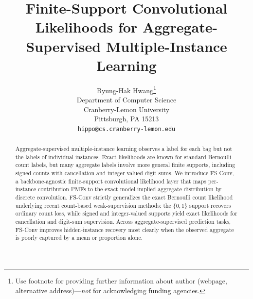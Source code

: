 \documentclass{article}
\title{Finite-Support Convolutional Likelihoods for Aggregate-Supervised Multiple-Instance Learning}
\author{%
  Byung-Hak Hwang\thanks{Use footnote for providing further information
    about author (webpage, alternative address)---\emph{not} for acknowledging
    funding agencies.} \\
  Department of Computer Science\\
  Cranberry-Lemon University\\
  Pittsburgh, PA 15213 \\
  \texttt{hippo@cs.cranberry-lemon.edu} \\
}
\begin{document}
\maketitle

\begin{abstract}
Aggregate-supervised multiple-instance learning observes a label for each bag but not the labels of individual instances.
Exact likelihoods are known for standard Bernoulli count labels, but many aggregate labels involve more general finite supports, including signed counts with cancellation and integer-valued digit sums.
We introduce FS-Conv, a backbone-agnostic finite-support convolutional likelihood layer that maps per-instance contribution PMFs to the exact model-implied aggregate distribution by discrete convolution.
FS-Conv strictly generalizes the exact Bernoulli count likelihood underlying recent count-based weak-supervision methods: the $\{0,1\}$ support recovers ordinary count loss, while signed and integer-valued supports yield exact likelihoods for cancellation and digit-sum supervision.
Across aggregate-supervised prediction tasks, FS-Conv improves hidden-instance recovery most clearly when the observed aggregate is poorly captured by a mean or proportion alone.
\end{abstract}















\appendix



\newpage

\end{document}
